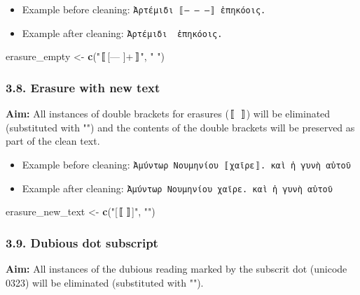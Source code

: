 \documentclass[]{article}
\newenvironment{Shaded}{\begin{snugshade}}{\end{snugshade}}
\newcommand{\KeywordTok}[1]{\textcolor[rgb]{0.13,0.29,0.53}{\textbf{#1}}}
\newcommand{\NormalTok}[1]{#1}
\newcommand{\StringTok}[1]{\textcolor[rgb]{0.31,0.60,0.02}{#1}}
\providecommand{\tightlist}{%
  \setlength{\itemsep}{0pt}\setlength{\parskip}{0pt}}
\begin{document}
\begin{itemize}
\tightlist
\item
  Example before cleaning: \texttt{Ἀρτέμιδι\ 〚—\ —\ —〛\ ἐπηκόοις.}
\item
  Example after cleaning: \texttt{Ἀρτέμιδι\ \ ἐπηκόοις.}
\end{itemize}

\begin{Shaded}
\begin{Highlighting}[]
\NormalTok{erasure_empty <-}\StringTok{ }\KeywordTok{c}\NormalTok{(}\StringTok{"〚[— ]+〛"}\NormalTok{, }\StringTok{" "}\NormalTok{)}
\end{Highlighting}
\end{Shaded}

\hypertarget{erasure-with-new-text}{%
\subsubsection{3.8. Erasure with new text}\label{erasure-with-new-text}}

\textbf{Aim:} All instances of double brackets for erasures (〚 〛) will
be eliminated (substituted with "") and the contents of the double
brackets will be preserved as part of the clean text.

\begin{itemize}
\tightlist
\item
  Example before cleaning:
  \texttt{Ἀμύντωρ\ Νουμηνίου\ 〚χαῖρε〛.\ καὶ\ ἡ\ γυνὴ\ αὐτοῦ}
\item
  Example after cleaning:
  \texttt{Ἀμύντωρ\ Νουμηνίου\ χαῖρε.\ καὶ\ ἡ\ γυνὴ\ αὐτοῦ}
\end{itemize}

\begin{Shaded}
\begin{Highlighting}[]
\NormalTok{erasure_new_text <-}\StringTok{ }\KeywordTok{c}\NormalTok{(}\StringTok{"[〚〛]"}\NormalTok{, }\StringTok{""}\NormalTok{)}
\end{Highlighting}
\end{Shaded}

\hypertarget{dubious-dot-subscript}{%
\subsubsection{3.9. Dubious dot subscript}\label{dubious-dot-subscript}}

\textbf{Aim:} All instances of the dubious reading marked by the
subscrit dot (unicode 0323) will be eliminated (substituted with "").
\end{document}
